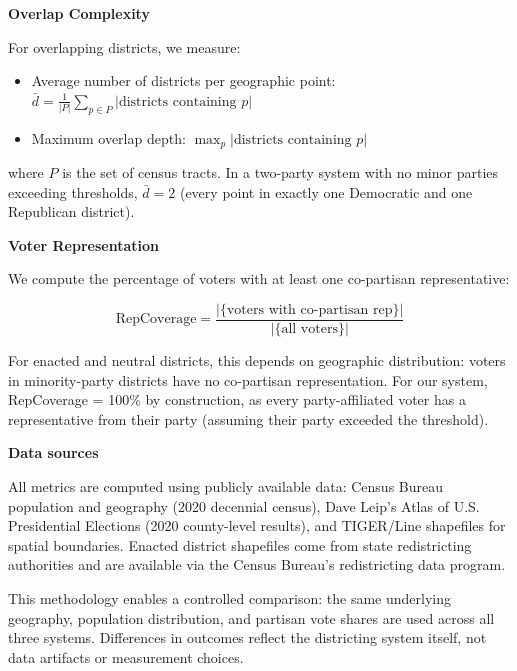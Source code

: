 \textbf{Overlap Complexity}

For overlapping districts, we measure:
\begin{itemize}
    \item Average number of districts per geographic point: $\bar{d} = \frac{1}{|P|}\sum_{p \in P} |\text{districts containing } p|$
    \item Maximum overlap depth: $\max_p |\text{districts containing } p|$
\end{itemize}

where $P$ is the set of census tracts. In a two-party system with no minor parties exceeding thresholds, $\bar{d} = 2$ (every point in exactly one Democratic and one Republican district).

\textbf{Voter Representation}

We compute the percentage of voters with at least one co-partisan representative:

\begin{equation}
\text{RepCoverage} = \frac{|\{\text{voters with co-partisan rep}\}|}{|\{\text{all voters}\}|}
\end{equation}

For enacted and neutral districts, this depends on geographic distribution: voters in minority-party districts have no co-partisan representation. For our system, RepCoverage = 100\% by construction, as every party-affiliated voter has a representative from their party (assuming their party exceeded the threshold).

\textbf{Data sources}

All metrics are computed using publicly available data: Census Bureau population and geography (2020 decennial census), Dave Leip's Atlas of U.S. Presidential Elections (2020 county-level results), and TIGER/Line shapefiles for spatial boundaries. Enacted district shapefiles come from state redistricting authorities and are available via the Census Bureau's redistricting data program.

This methodology enables a controlled comparison: the same underlying geography, population distribution, and partisan vote shares are used across all three systems. Differences in outcomes reflect the districting system itself, not data artifacts or measurement choices.
